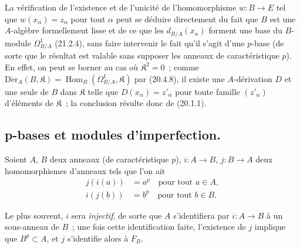 \begin{remark}[21.2.8]
\label{0.21.2.8-fr}
La vérification de l'existence et de l'unicité de l'homomorphisme $w:B\to E$
tel que $w(x_\alpha)=z_\alpha$ pour tout $\alpha$ peut se déduire directement
du fait que $B$ est une $A$-algèbre formellement lisse et de ce que les
$d_{B/A}(x_\alpha)$ forment une base du $B$-module $\Omega^1_{B/A}$ (21.2.4),
sans faire intervenir le fait qu'il s'agit d'une $p$-base (de sorte que le
résultat est valable sans supposer les anneaux de caractéristique $p$).
En effet, on peut se borner au cas où $\mathfrak K^2=0$~; comme
$\operatorname{D\acute{e}r}_A(B,\mathfrak K)=\operatorname{Hom}_B(\Omega^1_{B/A},\mathfrak K)$
par (20.4.8), il existe une $A$-dérivation $D$ et une seule de $B$ dans
$\mathfrak K$ telle que $D(x_\alpha)=z'_\alpha$ pour toute famille
$(z'_\alpha)$ d'éléments de $\mathfrak K$~; la conclusion résulte donc de (20.1.1).
\end{remark}

\subsection{p-bases et modules d'imperfection.}
\label{0.21.3-fr}

\begin{env}[21.3.1]
\label{0.21.3.1-fr}
Soient $A$, $B$ deux anneaux (de caractéristique $p$), $i:A\to B$,
$j:B\to A$ deux homomorphismes d'anneaux tels que l'on ait
\begin{align}
\tag{21.3.1.1}\label{0.21.3.1.1-fr}
j(i(a))&=a^p\quad\text{pour tout }a\in A,\\
\tag{21.3.1.2}\label{0.21.3.1.2-fr}
i(j(b))&=b^p\quad\text{pour tout }b\in B.
\end{align}

Le plus souvent, $i$ sera \emph{injectif}, de sorte que $A$ s'identifiera par
$i:A\to B$ à un sous-anneau de $B$~; une fois cette identification faite,
l'existence de $j$ implique que $B^p\subset A$, et $j$ s'identifie alors à $F_B$.
\end{env}

